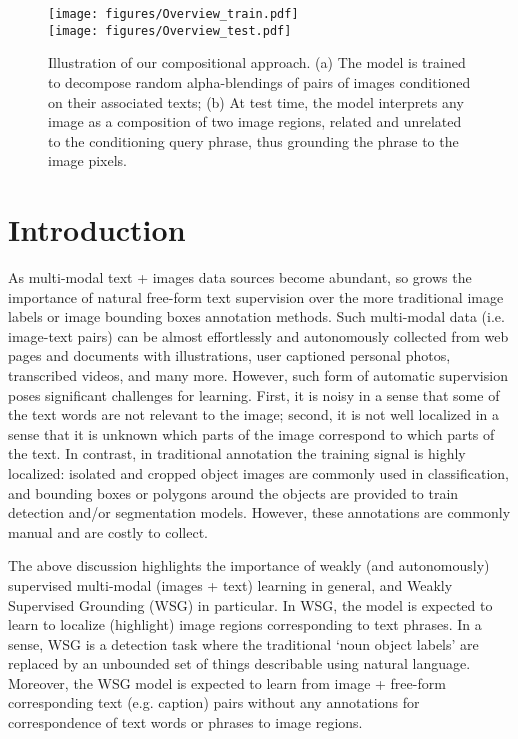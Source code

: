 \documentclass[10pt,twocolumn,letterpaper]{article}
\newcommand\secvspace{\vspace{-0.0cm}}
\newcommand\figvspace{\vspace{-0.2cm}}
\begin{document}
\begin{figure}
\begin{center}
\texttt{[image: figures/Overview\_train.pdf]}\\
\texttt{[image: figures/Overview\_test.pdf]}
\end{center}
   \caption{Illustration of our compositional approach. (a) The model is trained to decompose random alpha-blendings of pairs of images conditioned on their associated texts; (b) At test time, the model interprets any image as a composition of two image regions, related and unrelated to the conditioning query phrase, thus grounding the phrase to the image pixels. }
\figvspace
\label{fig:approach_intro}
\end{figure}
\secvspace
\section{Introduction}\label{sec:intro}
\secvspace
As multi-modal text + images data sources become abundant, so grows the importance of natural free-form text supervision \cite{radford2021learning} over the more traditional image labels or image bounding boxes annotation methods. Such multi-modal data (i.e. image-text pairs) can be almost effortlessly and autonomously collected from web pages and documents with illustrations, user captioned personal photos, transcribed videos, and many more. However, such form of automatic supervision poses significant challenges for learning. First, it is noisy in a sense that some of the text words are not relevant to the image; second, it is not well localized in a sense that it is unknown which parts of the image correspond to which parts of the text. In contrast, in traditional annotation the training signal is highly localized: isolated and cropped object images are commonly used in classification, and bounding boxes or polygons around the objects are provided to train detection and/or segmentation models. However, these annotations are commonly manual and are costly to collect.

The above discussion highlights the importance of weakly (and autonomously) supervised multi-modal (images + text) learning in general, and Weakly Supervised Grounding (WSG) in particular. 
In WSG, the model is expected to learn to localize (highlight) image regions corresponding to text phrases. In a sense, WSG is a detection task where the traditional `noun object labels' are replaced by an unbounded set of things describable using natural language. Moreover, the WSG model is expected to learn from image + free-form corresponding text (e.g. caption) pairs without any annotations for correspondence of text words or phrases to image regions.
\end{document}
